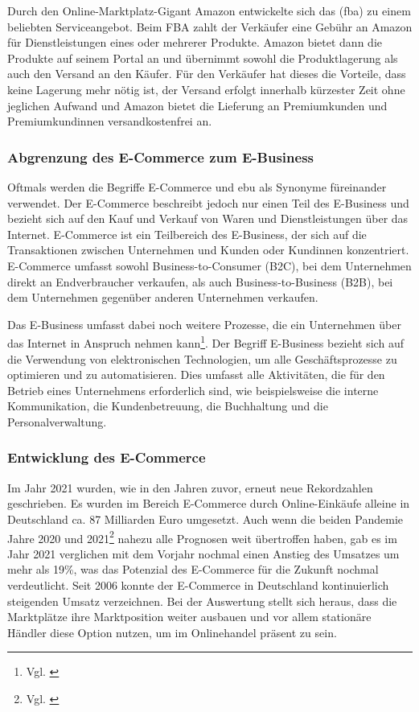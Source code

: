 Durch den Online-Marktplatz-Gigant Amazon entwickelte sich das (\ac{fba}) zu einem beliebten Serviceangebot. Beim FBA zahlt der Verkäufer eine Gebühr an Amazon für Dienstleistungen eines oder mehrerer Produkte. Amazon bietet dann die Produkte auf seinem Portal an und übernimmt sowohl die Produktlagerung als auch den Versand an den Käufer. Für den Verkäufer hat dieses die Vorteile, dass keine Lagerung mehr nötig ist, der Versand erfolgt innerhalb kürzester Zeit ohne jeglichen Aufwand und Amazon bietet die Lieferung an Premiumkunden und Premiumkundinnen versandkostenfrei an.

\subsubsection{Abgrenzung des E-Commerce zum E-Business}\label{unterabschnitt_2_1_1}
Oftmals werden die Begriffe E-Commerce und \ac{ebu} als Synonyme füreinander verwendet. Der E-Commerce beschreibt jedoch nur einen Teil des E-Business und bezieht sich auf den Kauf und Verkauf von Waren und Dienstleistungen über das Internet. E-Commerce ist ein Teilbereich des E-Business, der sich auf die Transaktionen zwischen Unternehmen und Kunden oder Kundinnen konzentriert. E-Commerce umfasst sowohl Business-to-Consumer (B2C), bei dem Unternehmen direkt an Endverbraucher verkaufen, als auch Business-to-Business (B2B), bei dem Unternehmen gegenüber anderen Unternehmen verkaufen.
\newline

Das E-Business umfasst dabei noch weitere Prozesse, die ein Unternehmen über das Internet in Anspruch nehmen kann\footnote{ Vgl. \autocite [S.71] {Meidl2014}}.
\newline
Der Begriff E-Business bezieht sich auf die Verwendung von elektronischen Technologien, um alle Geschäftsprozesse zu optimieren und zu automatisieren. Dies umfasst alle Aktivitäten, die für den Betrieb eines Unternehmens erforderlich sind, wie beispielsweise die interne Kommunikation, die Kundenbetreuung, die Buchhaltung und die Personalverwaltung.


\subsubsection{Entwicklung des E-Commerce}\label{unterabschnitt_2_1_2}
Im Jahr 2021 wurden, wie in den Jahren zuvor, erneut neue Rekordzahlen geschrieben. Es wurden im Bereich E-Commerce durch Online-Einkäufe alleine in Deutschland ca. 87 Milliarden Euro umgesetzt.
\newline
Auch wenn die beiden Pandemie Jahre 2020 und 2021\footnote{Vgl. \autocite [Online] {Wikipedia2019}} nahezu alle Prognosen weit übertroffen haben, gab es im Jahr 2021 verglichen mit dem Vorjahr nochmal einen Anstieg des Umsatzes um mehr als 19\%, was das Potenzial des E-Commerce für die Zukunft nochmal verdeutlicht. Seit 2006 konnte der E-Commerce in Deutschland kontinuierlich steigenden Umsatz verzeichnen. Bei der Auswertung stellt sich heraus, dass die Marktplätze ihre Marktposition weiter ausbauen und vor allem stationäre Händler diese Option nutzen, um im Onlinehandel präsent zu sein.
\newline

